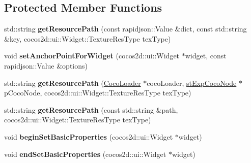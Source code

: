 \subsection*{Protected Member Functions}
\begin{DoxyCompactItemize}
\item 
\mbox{\label{classcocostudio_1_1WidgetReader_a8dc3cb91aac78f30dc49a276757557a5}} 
std\+::string {\bfseries get\+Resource\+Path} (const rapidjson\+::\+Value \&dict, const std\+::string \&key, cocos2d\+::ui\+::\+Widget\+::\+Texture\+Res\+Type tex\+Type)
\item 
\mbox{\label{classcocostudio_1_1WidgetReader_a017a7e775ee68dc539d6d900063d7202}} 
void {\bfseries set\+Anchor\+Point\+For\+Widget} (cocos2d\+::ui\+::\+Widget $\ast$widget, const rapidjson\+::\+Value \&options)
\item 
\mbox{\label{classcocostudio_1_1WidgetReader_abd6f9ca97aa397471062889b36f7eab4}} 
std\+::string {\bfseries get\+Resource\+Path} (\hyperlink{classcocostudio_1_1CocoLoader}{Coco\+Loader} $\ast$coco\+Loader, \hyperlink{structcocostudio_1_1stExpCocoNode}{st\+Exp\+Coco\+Node} $\ast$p\+Coco\+Node, cocos2d\+::ui\+::\+Widget\+::\+Texture\+Res\+Type tex\+Type)
\item 
\mbox{\label{classcocostudio_1_1WidgetReader_a18dfec1bd6b3830e2819ffc0a7439185}} 
std\+::string {\bfseries get\+Resource\+Path} (const std\+::string \&path, cocos2d\+::ui\+::\+Widget\+::\+Texture\+Res\+Type tex\+Type)
\item 
\mbox{\label{classcocostudio_1_1WidgetReader_a11e28479d394fc102f2d62e50a53eaeb}} 
void {\bfseries begin\+Set\+Basic\+Properties} (cocos2d\+::ui\+::\+Widget $\ast$widget)
\item 
\mbox{\label{classcocostudio_1_1WidgetReader_adfb18f27b32d532411e19fcc1afc3cf4}} 
void {\bfseries end\+Set\+Basic\+Properties} (cocos2d\+::ui\+::\+Widget $\ast$widget)
\item 
\mbox{\label{classcocostudio_1_1WidgetReader_a8dc3cb91aac78f30dc49a276757557a5}} 

\end{DoxyCompactItemize}
